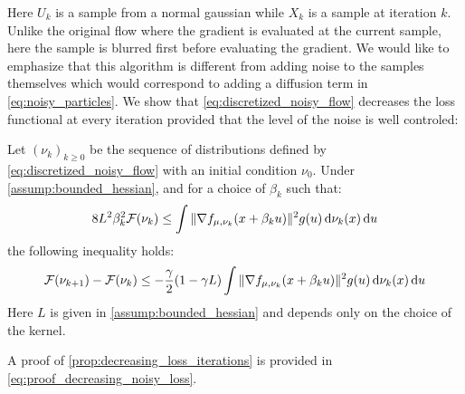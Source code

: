 Here $U_k$ is a sample from a normal gaussian while $X_k$ is a sample at iteration $k$. Unlike the original flow where the gradient is evaluated at the current sample, here the sample is blurred first before evaluating the gradient. We would like to emphasize that this algorithm is different from adding noise to the samples themselves which would correspond to adding a diffusion term in \cref{eq:noisy_particles}. We show that \cref{eq:discretized_noisy_flow} decreases the loss functional at every iteration provided that the level of the noise is well controled:
\begin{proposition}\label{prop:decreasing_loss_iterations}
	Let $(\nu_k)_{k\geq 0}$ be the sequence of distributions defined by \cref{eq:discretized_noisy_flow} with an initial condition $\nu_0$. Under \cref{assump:bounded_hessian}, and for a choice of $\beta_k$ such that:
	\begin{align}\label{eq:control_level_noise}
		8L^2\beta_k^2 {{\mathcal F}}(\nu_k) \leq \int \Vert \nabla f_{\mu,\nu_k}(x+\beta_k u) \Vert^2 g(u) \mathop{}\!\mathrm{d} \nu_k(x)\mathop{}\!\mathrm{d} u   
	\end{align}
	 the following inequality holds:
	\begin{align}\label{eq:decreasing_loss_iterations}
		{{\mathcal F}}(\nu_{k+1}) - {{\mathcal F}}(\nu_k  ) \leq -\frac{\gamma}{2}(1-\gamma L)\int \Vert \nabla f_{\mu,\nu_k}(x+\beta_k u) \Vert^2 g(u) \mathop{}\!\mathrm{d}\nu_k(x) \mathop{}\!\mathrm{d} u
	\end{align}
	Here $L$ is given in \cref{assump:bounded_hessian} and depends only on the choice of the kernel.
\end{proposition}
A proof of \cref{prop:decreasing_loss_iterations} is provided in \cref{eq:proof_decreasing_noisy_loss}.
